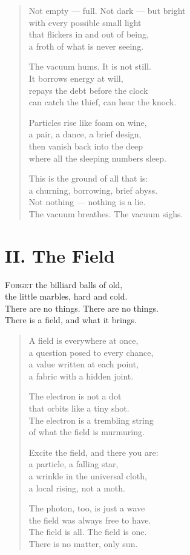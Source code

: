 \documentclass[11pt]{book}
\begin{document}
\begin{verse}
Not empty --- full. Not dark --- but bright\\
with every possible small light\\
that flickers in and out of being,\\
a froth of what is never seeing.

The vacuum hums. It is not still.\\
It borrows energy at will,\\
repays the debt before the clock\\
can catch the thief, can hear the knock.

Particles rise like foam on wine,\\
a pair, a dance, a brief design,\\
then vanish back into the deep\\
where all the sleeping numbers sleep.

This is the ground of all that is:\\
a churning, borrowing, brief abyss.\\
Not nothing --- nothing is a lie.\\
The vacuum breathes. The vacuum sighs.
\end{verse}

\section*{II. The Field}
\lettrine{F}{orget} the billiard balls of old,\\
the little marbles, hard and cold.\\
There are no things. There are no things.\\
There is a field, and what it brings.

\begin{verse}
A field is everywhere at once,\\
a question posed to every chance,\\
a value written at each point,\\
a fabric with a hidden joint.

The electron is not a dot\\
that orbits like a tiny shot.\\
The electron is a trembling string\\
of what the field is murmuring.

Excite the field, and there you are:\\
a particle, a falling star,\\
a wrinkle in the universal cloth,\\
a local rising, not a moth.

The photon, too, is just a wave\\
the field was always free to have.\\
The field is all. The field is one.\\
There is no matter, only sun.
\end{verse}
\end{document}
